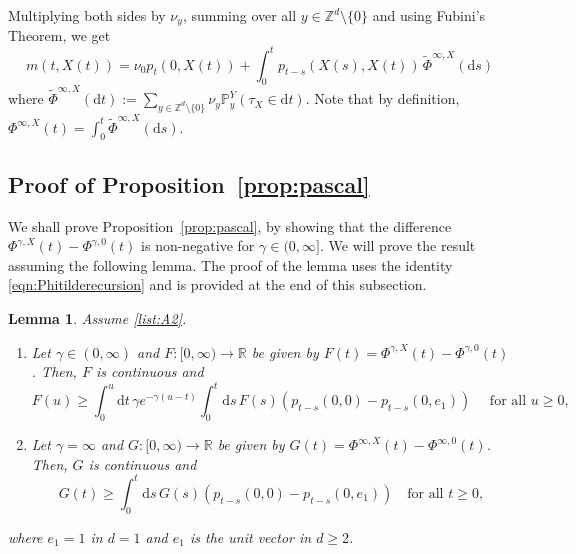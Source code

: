\documentclass{article}[12pt]
\newtheorem{lemma}{Lemma}[section]
\theoremstyle{definition}
\newcommand{\R}{\mathbb{R}}
\newcommand{\Z}{\mathbb{Z}}
\newcommand{\pr}{\mathbb{P}}
\newcommand{\1}{\mathbbm{1}}
\newcommand{\dd }{\mathrm{d} }
\begin{document}
Multiplying both sides by $\nu_y$, summing over all $y\in \Z^d\setminus\{0\}$ and using Fubini's Theorem, we get
\begin{equation}
    m(t,X(t)) = \nu_0 p_{t}(0,X(t))+  \int_{0}^t p_{t-s}(X(s),X(t))\, \tilde{\Phi}^{\infty, X}(\dd s)
    \label{eqn:Phiforgammainfinity} 
\end{equation}
where $\tilde{\Phi}^{\infty, X}(\dd t):=\sum_{y\in\Z^d\setminus \{0\}}\nu_y \pr^Y_y(\tau_X \in \dd t)$. Note that by definition, $\Phi^{\infty, X}(t) = \int_0^t \tilde{\Phi}^{\infty, X}(\dd s)$.

\subsection{Proof of Proposition~\ref{prop:pascal}}
We shall prove Proposition~\ref{prop:pascal}, by showing that the difference $\Phi^{\gamma,X}(t)- \Phi^{\gamma,0}(t)$ is non-negative for $\gamma \in (0,\infty]$. 
 We will prove the result assuming the following lemma. The proof of the lemma uses the identity \eqref{eqn:Phitilderecursion} and is provided at the end of this subsection.
\begin{lemma}
Assume \ref{list:A2}. 
\begin{enumerate}
\item[(a)] Let $\gamma\in (0,\infty)$ and $F: [0,\infty) \to \R$ be given by $F(t)= {\Phi}^{\gamma, X}(t)-{\Phi}^{\gamma, 0}(t)$. Then, $F$ is continuous and 
\begin{equation} 
 F(u) \ge \int_0^u \dd t \,\gamma e^{-\gamma(u- t)} \int_0^t \dd s\, F(s) (p_{t-s}(0,0)- p_{t-s}(0, e_1)) \quad \text{ for all $u\geq 0$,}
 \label{eqn:FTineq}
 \end{equation}
\item[(b)] Let $\gamma = \infty$ and $G: [0,\infty) \to \R$ be given by $G(t)= {\Phi}^{\infty, X}(t)-{\Phi}^{\infty, 0}(t)$. Then, $G$ is continuous and 
\begin{equation} 
   G(t) \ge  \int_0^t \dd s\, G(s) (p_{t-s}(0,0)- p_{t-s}(0, e_1))\quad \text{for all }t\geq 0,
    \label{eqn:gtgammainfinite}
 \end{equation}
 \end{enumerate}
 where $e_1 = 1$ in $d=1$ and $e_1$ is the unit vector in $d\ge 2$.
 \label{clm:gammafinite}
\end{lemma}
\end{document}

